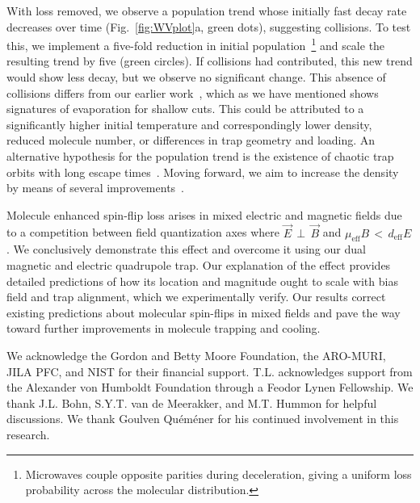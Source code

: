 \documentclass[%
 reprint,
 amsmath,amssymb,
 aps,
prl,
]{revtex4-1}
\newcommand{\red}[1]{{\color{black} #1}}
\newcommand{\epb}{{$\vec{E}\,{\perp}\,\vec{B}$}}
\begin{document}
With loss removed, we observe a population trend whose initially fast decay rate decreases over time (Fig.~\ref{fig:WVplot}a, green dots), suggesting collisions. 
To test this, we implement a five-fold reduction in initial population~\footnote{Microwaves couple opposite parities during deceleration, giving a uniform loss probability across the molecular distribution.} and scale the resulting trend by five (green circles). 
If collisions had contributed, this new trend would show less decay, but we observe no significant change. 
This absence of collisions differs from our earlier work~\cite{Stuhl2012evap}, which as we have mentioned shows signatures of evaporation for shallow cuts. 
This could be attributed to a significantly higher initial temperature and correspondingly lower density, reduced molecule number, or differences in trap geometry and loading. 
\red{An alternative hypothesis for the population trend is the existence of chaotic trap orbits with long escape times~\cite{Gonzalez-Ferez2014}.} 
Moving forward, we aim to increase the density by means of several improvements~\cite{Even2015,Segev2017}.

Molecule enhanced spin-flip loss arises in mixed electric and magnetic fields due to a competition between field quantization axes where \epb{} and $\mu_\text{eff}B\,{<}\,d_\text{eff}E$. 
We conclusively demonstrate this effect and overcome it using our dual magnetic and electric quadrupole trap. 
Our explanation of the effect provides detailed predictions of how its location and magnitude ought to scale with bias field and trap alignment, which we experimentally verify. 
Our results correct existing predictions about molecular spin-flips in mixed fields and pave the way toward further improvements in molecule trapping and cooling.

\begin{acknowledgments}
We acknowledge the Gordon and Betty Moore Foundation, the ARO-MURI, JILA PFC, and NIST for their financial support. 
T.L. acknowledges support from the Alexander von Humboldt Foundation through a Feodor Lynen Fellowship. 
We thank J.L. Bohn, S.Y.T. van de Meerakker, and M.T. Hummon for helpful discussions. 
We thank Goulven Qu\'em\'ener for his continued involvement in this research.
\end{acknowledgments}



\end{document}
